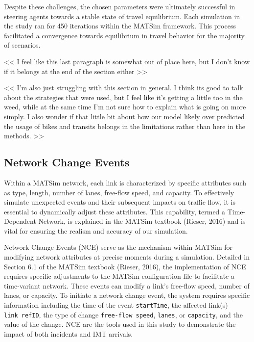 \documentclass[fancy, oneside, mastersfancy, ms]{byuthesis}
\begin{document}
Despite these challenges, the chosen parameters were ultimately
successful in steering agents towards a stable state of travel
equilibrium. Each simulation in the study ran for 450 iterations within
the MATSim framework. This process facilitated a convergence towards
equilibrium in travel behavior for the majority of scenarios.

\textless\textless{} I feel like this last paragraph is somewhat out of
place here, but I don't know if it belongs at the end of the section
either \textgreater\textgreater{}

\textless\textless{} I'm also just struggling with this section in
general. I think its good to talk about the strategies that were used,
but I feel like it's getting a little too in the weed, while at the same
time I'm not sure how to explain what is going on more simply. I also
wonder if that little bit about how our model likely over predicted the
usage of bikes and transits belongs in the limitations rather than here
in the methods. \textgreater\textgreater{}

\hypertarget{sec-NCE}{%
\subsection{Network Change Events}\label{sec-NCE}}

Within a MATSim network, each link is characterized by specific
attributes such as type, length, number of lanes, free-flow speed, and
capacity. To effectively simulate unexpected events and their subsequent
impacts on traffic flow, it is essential to dynamically adjust these
attributes. This capability, termed a Time-Dependent Network, is
explained in the MATSim textbook (Rieser, 2016) and is vital for
ensuring the realism and accuracy of our simulation.

Network Change Events (NCE) serve as the mechanism within MATSim for
modifying network attributes at precise moments during a simulation.
Detailed in Section 6.1 of the MATSim textbook (Rieser, 2016), the
implementation of NCE requires specific adjustments to the MATSim
configuration file to facilitate a time-variant network. These events
can modify a link's free-flow speed, number of lanes, or capacity. To
initiate a network change event, the system requires specific
information including the time of the event \texttt{startTime}, the
affected link(s) \texttt{link\ refID}, the type of change
\texttt{free-flow\ speed}, \texttt{lanes}, or \texttt{capacity}, and the
value of the change. NCE are the tools used in this study to demonstrate
the impact of both incidents and IMT arrivals.
\end{document}
